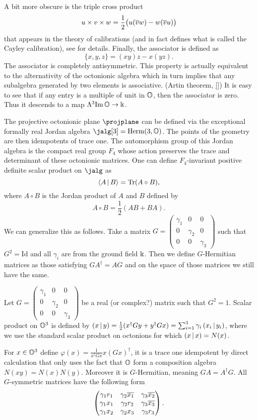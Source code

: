 A bit more obscure is the triple cross product 
\[
u \times v \times w = \frac{1}{2}\bigl( u(\overline{v}w) - w(\overline{v}u) \bigr)
\]
that appears in the theory of calibrations (and in fact defines what is called the Cayley calibration), see \cite{harvey, salamon} for details. Finally, the associator is defined as
\[
\{ x,y,z \} = (xy)z - x(yz).
\]
The associator is completely antisymmetric. This property is actually equivalent to the alternativity of the octonionic algebra which in turn implies that any subalgebra generated by two elements is associative. (Artin theorem, \ref{}) It is easy to see that if any entry is a multiple of unit in $\mathbb{O}$, then the associator is zero. Thus it descends to a map $\Lambda^3 \mathrm{Im}\, \mathbb{O} \to \Bbbk$.

The projective octonionic plane $\projplane$ can be defined via the exceptional formally real Jordan algebra $\jalg[3] = \mathrm{Herm}(3,\octo)$. The points of the geometry are then idempotents of trace one. The automorphism group of this Jordan algebra is the compact real group $F_4$ whose action preserves the trace and determinant of these octonionic matrices. One can define $F_4$-invariant positive definite scalar product on $\jalg$ as
\[
 \langle A\,|\, B \rangle = \mathrm{Tr}(A \circ B),
\]
where $A \circ B$ is the Jordan product of $A$ and $B$ defined by
\[
 A \circ B = \frac{1}{2} \left( AB + BA \right).
\]
We can generalize this as follows. Take a matrix $G=\begin{pmatrix} \gamma_1 & 0 & 0 \\ 0 & \gamma_2 & 0 \\ 0 & 0 & \gamma_3\end{pmatrix}$ such that $G^2 = \mathrm{Id}$ and all $\gamma_i$ are from the ground field $\Bbbk$. Then we define $G$-Hermitian matrices as those satisfying $GA^\dagger = AG$ and on the space of those matrices we still have the same.


Let $G = \begin{pmatrix} \gamma_1 & 0 & 0\\ 0 & \gamma_2 & 0\\ 0 & 0 & \gamma_3\end{pmatrix}$ be a real (or complex?) matrix such that $G^2 = 1$. Scalar product on $\mathbb{O}^3$ is defined by $\left( x \,|\, y \right) = \frac{1}{2}(x^\dagger G y + y^\dagger G x) = \sum_{i=1}^3 \gamma_i\left( x_i \,|\, y_i \right)$, where we use the standard scalar product on octonions for which $\left( x \,|\, x \right) = N(x)$.

 For $x\in\mathbb{O}^3$ define $\varphi (x) = \frac{1}{x^\dagger G x} x (Gx)^\dagger$, it is a trace one idempotent by direct calculation that only uses the fact that $\mathbb{O}$ form a composition algebra $N(xy) = N(x)N(y)$. Moreover it is $G$-Hermitian, meaning $GA=A^\dagger G$. All $G$-symmetric matrices have the following form
\begin{equation}\label{g-matrix}
  \begin{pmatrix}
  \gamma_1 r_1 & \gamma_2 \overline{x_1} & \gamma_3 \overline{x_2} \\
  \gamma_1 x_1 & \gamma_2 r_2 & \gamma_3 \overline{x_3} \\
  \gamma_1 x_2 & \gamma_2 x_3 & \gamma_3 r_3
  \end{pmatrix}.
\end{equation}

